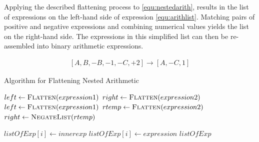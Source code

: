 Applying the described flattening process to \ref{equ:nestedarith}, results in the list of expressions on the left-hand side of expression \ref{equ:arithlist}. Matching pairs of positive and negative expressions and combining numerical values yields the list on the right-hand side. The expressions in this simplified list can then be re-assembled into binary arithmetic expressions.

\begin{align} \label{equ:arithlist}
    [A,B,-B,-1,-C,+2] \rightarrow [A,-C,1]
\end{align}

\begin{algorithm}
\caption{Algorithm for Flattening Nested Arithmetic}\label{alg:flatten}
\begin{algorithmic}
        \State $left \gets \Call{Flatten}{expression1}$
        \State $right \gets \Call{Flatten}{expression2}$
        \State \Return {}
        \State $left \gets \Call{Flatten}{expression1}$
        \State $rtemp \gets \Call{Flatten}{expression2}$
        \State $right \gets \Call{NegateList}{rtemp}$
        \State \Return {}
        \State \Return \State \Return {}
    \Else
        \State \Return [$expression$]
    \EndIf
\EndProcedure

            \State $listOfExp[i] \gets innerexp$
        \Else
            \State $listOfExp[i] \gets expression$
        \EndIf
    \EndFor
    \State \Return $listOfExp$
\EndProcedure
\end{algorithmic}
\end{algorithm}

